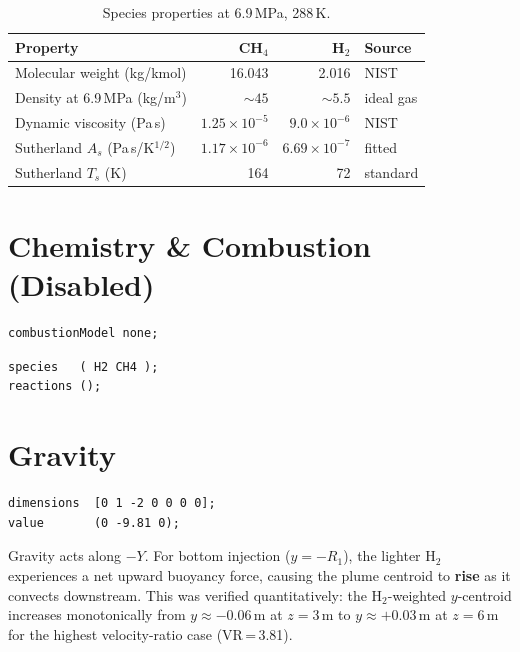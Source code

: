\documentclass[12pt,a4paper]{report}
\begin{document}
\begin{table}[H]
\centering
\caption{Species properties at 6.9\,MPa, 288\,K.}
\label{tab:species}
\small
\begin{tabular}{@{}lrrl@{}}
\toprule
\textbf{Property} & \textbf{CH$_4$} & \textbf{H$_2$} & \textbf{Source} \\
\midrule
Molecular weight (kg/kmol) & 16.043  & 2.016 & NIST \\
Density at 6.9\,MPa (kg/m$^3$) & $\sim 45$ & $\sim 5.5$ & ideal gas \\
Dynamic viscosity (Pa\,s) & $1.25\!\times\!10^{-5}$ & $9.0\!\times\!10^{-6}$ & NIST \\
Sutherland $A_s$ (Pa\,s/K$^{1/2}$) & $1.17\!\times\!10^{-6}$ & $6.69\!\times\!10^{-7}$ & fitted \\
Sutherland $T_s$ (K) & 164 & 72 & standard \\
\bottomrule
\end{tabular}
\end{table}


\section{Chemistry \& Combustion (Disabled)}

\begin{lstlisting}[language={},title=constant/combustionProperties]
combustionModel none;
\end{lstlisting}

\begin{lstlisting}[language={},title=constant/reactions]
species   ( H2 CH4 );
reactions ();
\end{lstlisting}


\section{Gravity}

\begin{lstlisting}[language={},title=constant/g]
dimensions  [0 1 -2 0 0 0 0];
value       (0 -9.81 0);
\end{lstlisting}

\noindent Gravity acts along $-Y$.  For bottom injection ($y = -R_1$),
the lighter H$_2$ experiences a net upward buoyancy force, causing the
plume centroid to \textbf{rise} as it convects downstream.  This was
verified quantitatively: the H$_2$-weighted $y$-centroid increases
monotonically from $y \approx -0.06$\,m at $z = 3$\,m to
$y \approx +0.03$\,m at $z = 6$\,m for the highest velocity-ratio case
(VR\,=\,3.81).
\end{document}
